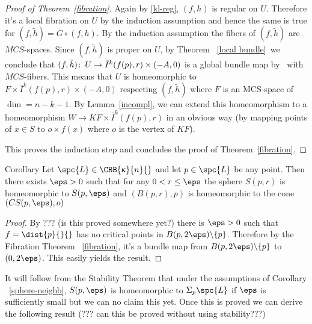\begin{proof}[Proof of Theorem~\ref{fibration}]
Again by  \eqref{kl-reg}, $(f, h)$ is  regular on $U$. Therefore it's a local fibration on $U$   by the induction assumption and hence the same is true for $(f,\tilde h)=G\circ (f,h)$.  By the induction assumption the fibers of   $(f,\tilde h)$ are $MCS$-spaces. Since  $(f,\tilde h)$ is proper on $U$, by Theorem ~\ref{local bundle}\ we conclude that   $(f,\tilde h)\co U\to \bar{I}^k(f(p),r)\times (-A,0)$ is a global  bundle map by~\cite[6.10]{Sieb} with $MCS$-fibers. This means that
$U$ is homeomorphic to $F\times  \bar{I}^k(f(p),r)\times (-A,0)$ respecting $(f,\tilde h)$ where $F$ is an MCS-space of $\dim=n-k-1$. By Lemma~\ref{incompl}, we can extend this homeomorphism to
a homeomorphism $W\to KF\times \bar{I}^k(f(p),r)$ in an obvious way (by mapping points of $x\in S$ to $o\times f(x)$ where $o$ is the vertex of $KF$).


This proves the induction step and concludes the proof of Theorem~\ref{fibration}.


\end{proof}

 \begin{thm}{Corollary}\label{sphere-neighb}
 Let $\spc{L}\in \CBB{\kappa}{n}{}$ and let $p\in \spc{L}$ be any point. Then there exists $\eps>0$ such that for any $0<r\le\eps$ the sphere $S(p,r)$ is homeomorphic to $S(p,\eps)$ and $(B(p,r),p)$ is homeomorphic to the cone $(CS(p,\eps),o)$
 \end{thm}
\begin{proof}
By ??? (is this proved somewhere yet?) there is $\eps>0$ such that  $f=\dist{p}{}{}$ has no critical points in $B(p,2\eps)\backslash\{p\}$. Therefore by the Fibration Theorem ~\eqref{fibration}, it's a bundle map from $B(p,2\eps)\backslash\{p\}$ to $(0,2\eps)$. This easily yields the result.
\end{proof}
It will follow from the Stability Theorem that under the assumptions of Corollary ~\ref{sphere-neighb}, $S(p,\eps)$ is homeomorphic to $\Sigma_p\spc{L}$ if $\eps$ is sufficiently small but we can no claim this yet.
Once this is proved we can derive the following result (??? can this be proved without using stability???)

